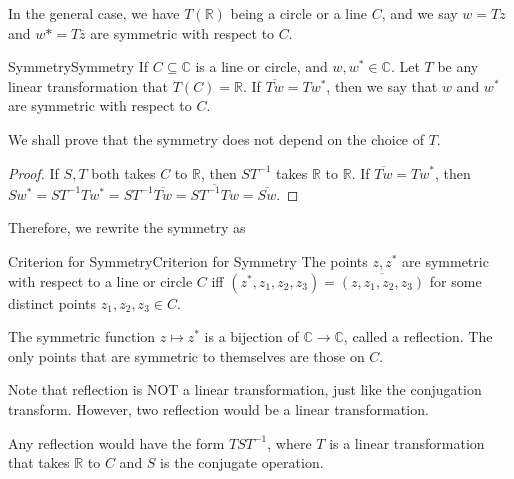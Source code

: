 \documentclass[../main.tex]{subfiles}
\begin{document}
In the general case, we have $T(\mathbb{R})$ being a circle or a line $C$, and we say $w=Tz$ and $w*=T \overline{z}$ are symmetric with respect to $C$.

\begin{definition}{Symmetry}{Symmetry}
If $C \subseteq \mathbb{C}$ is a line or circle, and $w,w^*\in \mathbb{C}$. Let $T$ be any linear transformation that $T(C) = \mathbb{R}$. If $\overline{Tw} = Tw^*$, then we say that $w$ and $w^*$ are symmetric with respect to $C$.
\end{definition}
We shall prove that the symmetry does not depend on the choice of $T$.
\begin{proof}
	If $S,T$ both takes $C$ to $\mathbb{R}$, then $ST^{-1}$ takes $\mathbb{R}$ to $\mathbb{R}$. If $\overline{Tw} = Tw^*$, then $Sw^* = ST^{-1}Tw^* = ST^{-1} \overline{Tw} = \overline{ST^{-1}Tw} = \overline{Sw}$. 
\end{proof}

Therefore, we rewrite the symmetry as
\begin{theorem}{Criterion for Symmetry}{Criterion for Symmetry}
	The points $z,z^*$ are symmetric with respect to a line or circle $C$ iff $(z^*,z_1,z_2,z_3) = \overline{(z,z_1,z_2,z_3)}$ for some distinct points $z_1,z_2,z_3\in C$.
\end{theorem}

The symmetric function $z \mapsto z^*$ is a bijection of $\mathbb{C} \rightarrow \mathbb{C}$, called a reflection. The only points that are symmetric to themselves are those on $C$.

\begin{remark}
Note that reflection is NOT a linear transformation, just like the conjugation transform. However, two reflection would be a linear transformation.

Any reflection would have the form $TST^{-1}$, where $T$ is a linear transformation that takes $\mathbb{R}$ to $C$ and $S$ is the conjugate operation.
\end{remark}
\end{document}
